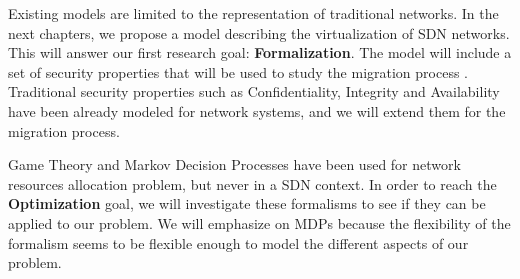 Existing models are limited to the representation of traditional networks.
In the next chapters, we propose a model describing the virtualization of SDN networks. This will answer our first research goal: \textbf{Formalization}. The model will include a set of security properties that will be used to study the migration process . Traditional security properties such as Confidentiality, Integrity and Availability have been already modeled for network systems, and we will extend them for the migration process.

Game Theory and Markov Decision Processes have been used for network resources allocation problem, but never in a SDN context. In order to reach the \textbf{Optimization} goal, we will investigate these formalisms to see if they can be applied to our problem. We will emphasize on MDPs because the flexibility of the formalism seems to be flexible enough to model the different aspects of our problem.


